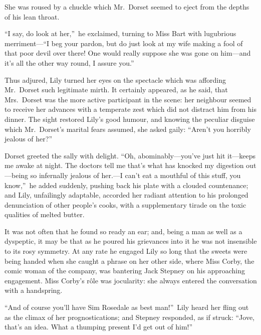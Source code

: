 \documentclass[12pt,a4paper]{book}
\begin{document}
She was roused by a chuckle which Mr.\ Dorset seemed to eject from
the depths of his lean throat.





``I say, do look at her,''\ he exclaimed, turning to Miss Bart with
lugubrious merriment---``I beg your pardon, but do just look at my
wife making a fool of that poor devil over there! One would
really suppose she was gone on him---and it's all the other way
round, I assure you.''





Thus adjured, Lily turned her eyes on the spectacle which was
affording Mr.\ Dorset such legitimate mirth. It certainly
appeared, as he said, that Mrs.\ Dorset was the more active
participant in the scene: her neighbour seemed to receive her
advances with a temperate zest which did not distract him from
his dinner. The sight restored Lily's good humour, and knowing
the peculiar disguise which Mr.\ Dorset's marital fears assumed,
she asked gaily: ``Aren't you horribly jealous of her?''





Dorset greeted the sally with delight. ``Oh, abominably---you've
just hit it---keeps me awake at night. The doctors tell me that's
what has knocked my digestion out---being so infernally jealous of
her.---I can't eat a mouthful of this stuff, you know,''\ he added
suddenly, pushing back his plate with a clouded countenance; and
Lily, unfailingly adaptable, accorded her radiant attention to
his prolonged denunciation of other people's cooks, with a
supplementary tirade on the toxic qualities of melted butter.





It was not often that he found so ready an ear; and, being a man
as well as a dyspeptic, it may be that as he poured his
grievances into it he was not insensible to its rosy symmetry. At
any rate he engaged Lily so long that the sweets were being
handed when she caught a phrase on her other side, where Miss
Corby, the comic woman of the company, was bantering Jack Stepney
on his approaching engagement. Miss Corby's r\^{o}le was
jocularity: she always entered the conversation with a
handspring.





``And of course you'll have Sim Rosedale as best man!''\ Lily heard
her fling out as the climax of her prognostications; and Stepney
responded, as if struck: ``Jove, that's an idea. What a thumping
present I'd get out of him!''
\end{document}
